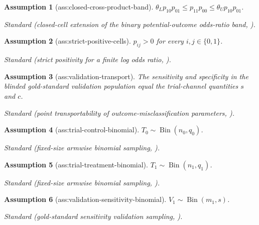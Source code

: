 \documentclass{article}
\newtheorem{assumption}{Assumption}
\begin{document}
\begin{assumption}[ass:closed-cross-product-band]\label{ass:closed-cross-product-band}
\(\theta_Lp_{10}p_{01}\le p_{11}p_{00}\le\theta_Up_{10}p_{01}\).
\par\smallskip\noindent\emph{Standard} (closed-cell extension of the binary potential-outcome odds-ratio band, \cite{CiocaneaTeodorescuGabrielSjolander2025}).
\end{assumption}

\begin{assumption}[ass:strict-positive-cells]\label{ass:strict-positive-cells}
\(p_{ij}>0\) for every \(i,j\in\{0,1\}\).
\par\smallskip\noindent\emph{Standard} (strict positivity for a finite log odds ratio, \cite{CiocaneaTeodorescuGabrielSjolander2025}).
\end{assumption}

\begin{assumption}[ass:validation-transport]\label{ass:validation-transport}
The sensitivity and specificity in the blinded gold-standard validation population equal the trial-channel quantities \(s\) and \(c\).
\par\smallskip\noindent\emph{Standard} (point transportability of outcome-misclassification parameters, \cite{RossColeEdwardsEtAl2024}).
\end{assumption}

\begin{assumption}[ass:trial-control-binomial]\label{ass:trial-control-binomial}
\(T_0\sim\operatorname{Bin}(n_0,q_0)\).
\par\smallskip\noindent\emph{Standard} (fixed-size armwise binomial sampling, \cite{ClopperPearson1934}).
\end{assumption}

\begin{assumption}[ass:trial-treatment-binomial]\label{ass:trial-treatment-binomial}
\(T_1\sim\operatorname{Bin}(n_1,q_1)\).
\par\smallskip\noindent\emph{Standard} (fixed-size armwise binomial sampling, \cite{ClopperPearson1934}).
\end{assumption}

\begin{assumption}[ass:validation-sensitivity-binomial]\label{ass:validation-sensitivity-binomial}
\(V_1\sim\operatorname{Bin}(m_1,s)\).
\par\smallskip\noindent\emph{Standard} (gold-standard sensitivity validation sampling, \cite{EdwardsZivichShookSaCole2026}).
\end{assumption}
\end{document}
